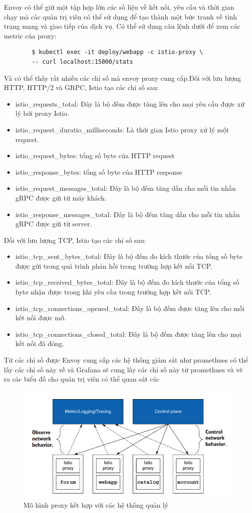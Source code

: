 \documentclass[14pt,a4paper]{book}
\begin{document}
{{	Envoy có thể giữ một tập hợp lớn các số liệu về kết nối, yêu cầu và thời gian chạy mà các quản trị viên có thể sử dụng để tạo thành một bức tranh về tình trạng mạng và giao tiếp của dịch vụ. Có thể sử dụng câu lệnh dưới để xem các metric của proxy:
	\begin{lstlisting}
		$ kubectl exec -it deploy/webapp -c istio-proxy \
		-- curl localhost:15000/stats
	\end{lstlisting}
	Và có thể thấy rất nhiều các chỉ số mà envoy proxy cung cấp.Đối với lưu lượng HTTP, HTTP/2 và GRPC, Istio tạo các chỉ số sau:
	\begin{itemize}				
		\item istio\_requests\_total: Đây là bộ đếm được tăng lên cho mọi yêu cầu được xử lý bởi proxy Istio.
		\item istio\_request\_duratio\_milliseconds: Là thời gian Istio proxy xử lý một request.
		\item  istio\_request\_bytes: tổng số byte của HTTP request
		\item  istio\_response\_bytes: tổng số byte của HTTP response
		\item  istio\_request\_messages\_total: Đây là bộ đếm tăng dần cho mỗi tin nhắn gRPC được gửi từ máy khách.
		\item istio\_response\_messages\_total: Đây là bộ đếm tăng dần cho mỗi tin nhắn gRPC được gửi từ server.
	\end{itemize}
	Đối với lưu lượng TCP, Istio tạo các chỉ số sau:
	\begin{itemize}				
		\item istio\_tcp\_sent\_bytes\_total: Đây là bộ đếm đo kích thước của tổng số byte được gửi trong quá trình phản hồi trong trường hợp kết nối TCP.
		\item istio\_tcp\_received\_bytes\_total: Đây là bộ đếm đo kích thước của tổng số byte nhận được trong khi yêu cầu trong trường hợp kết nối TCP.
		\item istio\_tcp\_connections\_opened\_total: Đây là bộ đếm được tăng lên cho mỗi kết nối được mở.
		\item istio\_tcp\_connections\_closed\_total: Đây là bộ đếm được tăng lên cho mọi kết nối đã đóng.
	\end{itemize}
	Từ các chỉ số được Envoy cung cấp các hệ thống giám sát như promethues có thể lấy các chỉ số này về và Grafana sẽ cung lấy các chỉ số này từ promethues và vẽ ra các biểu đồ cho quản trị viên có thể quan sát các 
	
	\begin{figure}[h]
		\centering
		\includegraphics[width=0.5\linewidth]{Pics/2.3.1-p1}
		\caption{Mô hình proxy kết hợp với các hệ thống quản lý}
		\label{fig:2}
	

\end{figure}}}
\end{document}
